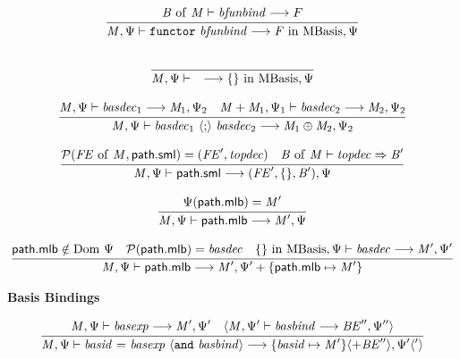 \begin{equation}
{\frac{\displaystyle\strut{
\mathit{B}~\mathrm{of}~\mathit{M} \vdash \mathit{bfunbind} \longrightarrow F
}}{\displaystyle\strut{
\mathit{M}, \Psi  \vdash \mathtt{functor}~ \mathit{bfunbind}
\longrightarrow \mathit{F} ~\mathrm{in}~ \mathrm{MBasis}, \Psi
}}}
\end{equation}

\begin{equation}
{\frac{\displaystyle\strut{
}}{\displaystyle\strut{
\mathit{M}, \Psi  \vdash \quad \longrightarrow \{\} ~\mathrm{in}~ \mathrm{MBasis}, \Psi
}}}
\end{equation}

\begin{equation}
{\frac{\displaystyle\strut{
\mathit{M}, \Psi  \vdash \mathit{basdec}_1 \longrightarrow \mathit{M}_1, \Psi_2 \quad
\mathit{M} + \mathit{M}_1, \Psi_1  \vdash \mathit{basdec}_2 \longrightarrow \mathit{M}_2, \Psi_2 
}}{\displaystyle\strut{
\mathit{M}, \Psi  \vdash \mathit{basdec}_1 ~\langle\mathtt{;}\rangle~ \mathit{basdec}_2 \longrightarrow \mathit{M}_1 \oplus \mathit{M}_2, \Psi_2
}}}
\end{equation}

\begin{equation}
{\frac{\displaystyle\strut{
\mathcal{P}(\mathit{FE}~\mathrm{of}~\mathit{M}, \mathsf{path.sml}) = (\mathit{FE}', \mathit{topdec}) \quad
\mathit{B}~\mathrm{of}~\mathit{M} \vdash \mathit{topdec} \Rightarrow \mathit{B}'
}}{\displaystyle\strut{
\mathit{M}, \Psi  \vdash \mathsf{path.sml}  \longrightarrow (\mathit{FE}',\{\},\mathit{B}'), \Psi
}}}
\end{equation}

\begin{equation}
{\frac{\displaystyle\strut{
\Psi(\mathsf{path.mlb}) = \mathit{M}'
}}{\displaystyle\strut{
\mathit{M}, \Psi  \vdash \mathsf{path.mlb}  \longrightarrow \mathit{M}', \Psi
}}}
\end{equation}

\begin{equation}
{\frac{\displaystyle\strut{
\mathsf{path.mlb} \notin \mathrm{Dom}~\Psi \quad
\mathcal{P}(\mathsf{path.mlb}) = \mathit{basdec} \quad
\{\} ~\mathrm{in}~ \mathrm{MBasis}, \Psi  \vdash \mathit{basdec} \longrightarrow \mathit{M}', \Psi'
}}{\displaystyle\strut{
\mathit{M}, \Psi  \vdash \mathsf{path.mlb}  \longrightarrow \mathit{M}', \Psi' + \{\mathsf{path.mlb} \mapsto \mathit{M}'\} 
}}}
\end{equation}

\vspace{2\parsep}
{\large\noindent
\textbf{Basis Bindings} \hfill 
{}
}\nopagebreak

\begin{equation}
{\frac{\displaystyle\strut{
\mathit{M}, \Psi \vdash \mathit{basexp} \longrightarrow \mathit{M}', \Psi' \quad
\langle\mathit{M}, \Psi' \vdash \mathit{basbind} \longrightarrow \mathit{BE}'', \Psi''\rangle
}}{\displaystyle\strut{
\mathit{M}, \Psi  \vdash \mathit{basid} ~\mathtt{=}~ \mathit{basexp} ~\langle\mathtt{and}~\mathit{basbind}\rangle \longrightarrow 
\{\mathit{basid} \mapsto \mathit{M}'\} \langle+ \mathit{BE}''\rangle, \Psi'\langle'\rangle
}}}
\end{equation}

